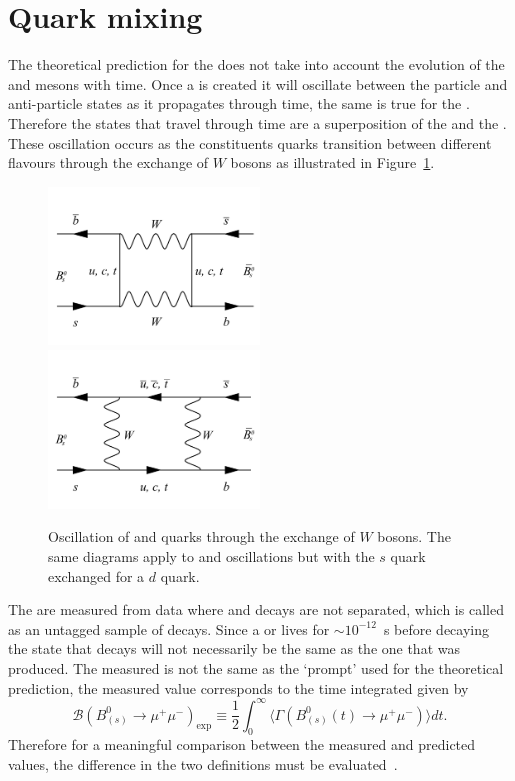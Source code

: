 {\section{Quark mixing}
\label{sec:quarkmaixing}
The theoretical prediction for the \bmumu \BFs does not take into account the evolution of the \bsd and \barbsd mesons with time. Once a \bsd is created it will oscillate between the particle and anti-particle states as it propagates through time, the same is true for the \barbsd. Therefore the states that travel through time are a superposition of the \bsd and the \barbsd. These oscillation occurs as the constituents quarks transition between different flavours through the exchange of $W$ bosons as illustrated in Figure~\ref{fig:Oscl_diag}.
\begin{figure}[htbp]
    \centering
        \includegraphics[width=0.5\textwidth]{./Figs/Theory/Oscillation_1.pdf}
        \includegraphics[width=0.5\textwidth]{./Figs/Theory/Oscillation_2.pdf}
    \caption{Oscillation of \bs and \barbs quarks through the exchange of $W$ bosons. The same diagrams apply to \bd and \barbd oscillations but with the $s$ quark exchanged for a $d$ quark.}
    \label{fig:Oscl_diag}
\end{figure}
The \BFs are measured from data where \bsd and \barbsd decays are not separated, which is called as an untagged sample of \bmumu decays. Since a \bsd or \barbsd lives for $\sim 10^{-12}$~s before decaying the state that decays will not necessarily be the same as the one that was produced. The measured \BF is not the same as the `prompt' \BF used for the theoretical prediction, the measured value corresponds to the time integrated \BF given by~\cite{DeBruyn:2012wj}
\begin{equation}
  \mathcal{B}(B^0_{(s)} \to \mu^+ \mu^-)_{\mathrm{exp}} \equiv \frac{1}{2} \int^{\infty}_0 \langle \Gamma(B^0_{(s)}(t) \to \mu^+\mu^-) \rangle dt.
\label{eq:time_BF}
\end{equation}
Therefore for a meaningful comparison between the measured and predicted \BF values, the difference in the two definitions must be evaluated~\cite{DeBruyn:2012wk,Buras:2013uqa,DeBruyn:2012wj}.

}
